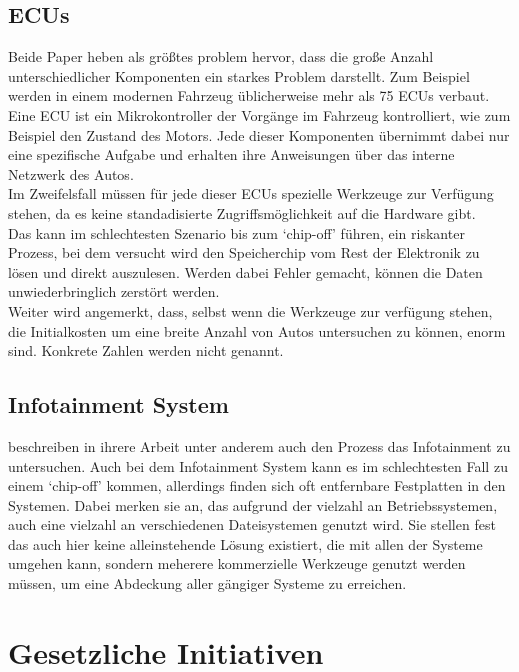 \documentclass[conference,compsoc,final,a4paper]{IEEEtran}
\begin{document}
\subsection{ECUs}
Beide Paper heben als größtes problem hervor, dass die große Anzahl unterschiedlicher Komponenten ein starkes Problem darstellt.
Zum Beispiel werden in einem modernen Fahrzeug üblicherweise mehr als 75 \ac{ECU}s verbaut.~\cite{Stopka_2019}
Eine \ac{ECU} ist ein Mikrokontroller der Vorgänge im Fahrzeug kontrolliert, wie zum Beispiel den Zustand des Motors. Jede dieser
Komponenten übernimmt dabei nur eine spezifische Aufgabe und erhalten ihre Anweisungen über das interne Netzwerk des Autos.\\
Im Zweifelsfall müssen für jede dieser \ac{ECU}s spezielle Werkzeuge zur Verfügung stehen, da es keine standadisierte Zugriffsmöglichkeit
auf die Hardware gibt.\\
Das kann im schlechtesten Szenario bis zum `chip-off' führen, ein riskanter Prozess, bei dem versucht wird den Speicherchip vom Rest der Elektronik
zu lösen und direkt auszulesen.
Werden dabei Fehler gemacht, können die Daten unwiederbringlich zerstört werden.\\
Weiter wird angemerkt, dass, selbst wenn die Werkzeuge zur verfügung stehen, die Initialkosten um eine breite Anzahl von Autos untersuchen zu können,
enorm sind. Konkrete Zahlen werden nicht genannt.\\

\subsection{Infotainment System}
 beschreiben in ihrere Arbeit unter anderem auch den Prozess das Infotainment zu untersuchen.
Auch bei dem Infotainment System kann es im schlechtesten Fall zu einem `chip-off' kommen, allerdings finden sich oft entfernbare Festplatten in den Systemen.
Dabei merken sie an, das aufgrund der vielzahl an Betriebssystemen, auch eine vielzahl an verschiedenen Dateisystemen genutzt wird.
Sie stellen fest das auch hier keine alleinstehende Lösung existiert, die mit allen der Systeme umgehen kann, sondern meherere
kommerzielle Werkzeuge genutzt werden müssen, um eine Abdeckung aller gängiger Systeme zu erreichen.

\section{Gesetzliche Initiativen}
\end{document}
